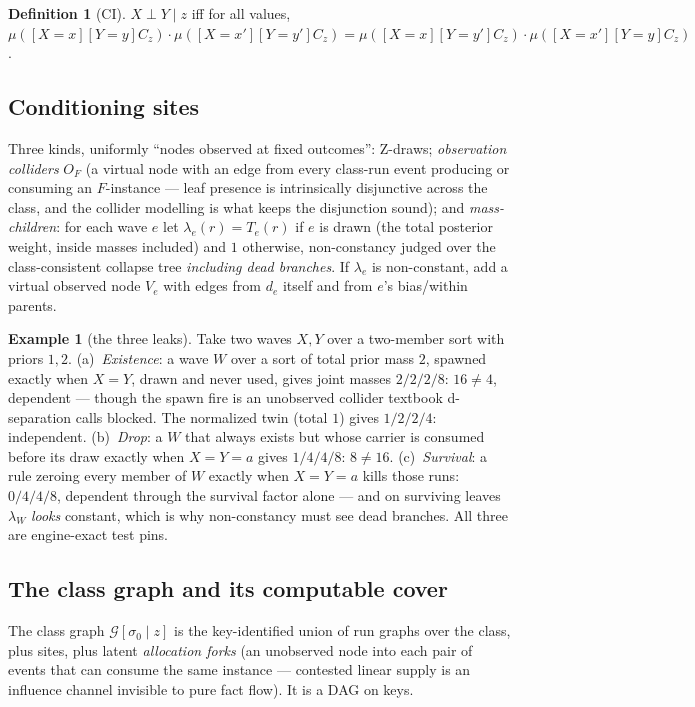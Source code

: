 \documentclass[11pt]{article}
\newcommand{\CI}{\perp}
\theoremstyle{definition}
\newtheorem{definition}[theorem]{Definition}
\newtheorem{example}[theorem]{Example}
\theoremstyle{remark}
\begin{document}
\begin{definition}[CI]
$X \CI Y \mid z$ iff for all values,
$\mu([X{=}x][Y{=}y]C_z)\cdot\mu([X{=}x'][Y{=}y']C_z)
= \mu([X{=}x][Y{=}y']C_z)\cdot\mu([X{=}x'][Y{=}y]C_z)$.
\end{definition}

\subsection{Conditioning sites}
\label{sec:sites}

Three kinds, uniformly ``nodes observed at fixed outcomes'':
Z-draws; \emph{observation colliders} $O_F$ (a virtual node with an
edge from every class-run event producing or consuming an $F$-instance
--- leaf presence is intrinsically disjunctive across the class, and
the collider modelling is what keeps the disjunction sound); and
\emph{mass-children}: for each wave $e$ let $\lambda_e(r) = T_e(r)$ if
$e$ is drawn (the total posterior weight, inside masses included) and
$1$ otherwise, non-constancy judged over the class-consistent collapse
tree \emph{including dead branches}.  If $\lambda_e$ is non-constant,
add a virtual observed node $V_e$ with edges from $d_e$ itself and
from $e$'s bias/within parents.

\begin{example}[the three leaks]
\label{ex:leaks}
Take two waves $X, Y$ over a two-member sort with priors $1, 2$.
(a)~\emph{Existence}: a wave $W$ over a sort of total prior mass $2$,
spawned exactly when $X{=}Y$, drawn and never used, gives joint masses
$2/2/2/8$: $16 \neq 4$, dependent --- though the spawn fire is an
unobserved collider textbook d-separation calls blocked.  The
normalized twin (total $1$) gives $1/2/2/4$: independent.
(b)~\emph{Drop}: a $W$ that always exists but whose carrier is
consumed before its draw exactly when $X{=}Y{=}a$ gives $1/4/4/8$:
$8 \neq 16$.  (c)~\emph{Survival}: a rule zeroing every member of $W$
exactly when $X{=}Y{=}a$ kills those runs: $0/4/4/8$, dependent
through the survival factor alone --- and on surviving leaves
$\lambda_W$ \emph{looks} constant, which is why non-constancy must see
dead branches.  All three are engine-exact test pins.
\end{example}

\subsection{The class graph and its computable cover}

The class graph $\mathcal{G}[\sigma_0 \mid z]$ is the key-identified
union of run graphs over the class, plus sites, plus latent
\emph{allocation forks} (an unobserved node into each pair of events
that can consume the same instance --- contested linear supply is an
influence channel invisible to pure fact flow).  It is a DAG on keys.
\end{document}
